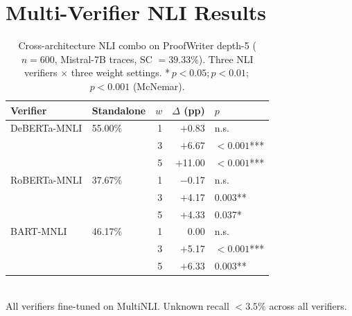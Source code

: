 \begin{table}[h]
\centering
\small
\caption{DRC on Mistral-7B ($K{=}12$, DeBERTa-large-mnli, $w{=}3$). $\tau{=}0.7$ recovers 83--90\% of full-combo gain at ${\sim}35\%$ NLI cost across both datasets.}
\label{tab:drc}
\end{table}

\section{Multi-Verifier NLI Results}
\label{app:multi-nli}

\begin{table}[h]
\centering
\small
\caption{Cross-architecture NLI combo on ProofWriter depth-5 ($n{=}600$, Mistral-7B traces, SC $= 39.33\%$). Three NLI verifiers $\times$ three weight settings. {*}\,$p < 0.05$;\enspace{**}\,$p < 0.01$;\enspace{***}\,$p < 0.001$ (McNemar).}
\label{tab:multi-nli}
\setlength{\tabcolsep}{3pt}
\begin{tabular}{@{}llrrl@{}}
\toprule
Verifier & Standalone & $w$ & $\Delta$ (pp) & $p$ \\
\midrule
DeBERTa-MNLI & 55.00\% & 1 & $+$0.83 & n.s. \\
 & & 3 & $+$6.67 & ${<}0.001${***} \\
 & & 5 & $+$11.00 & ${<}0.001${***} \\
\addlinespace
RoBERTa-MNLI & 37.67\% & 1 & $-$0.17 & n.s. \\
 & & 3 & $+$4.17 & 0.003{**} \\
 & & 5 & $+$4.33 & 0.037{*} \\
\addlinespace
BART-MNLI & 46.17\% & 1 & 0.00 & n.s. \\
 & & 3 & $+$5.17 & ${<}0.001${***} \\
 & & 5 & $+$6.33 & 0.003{**} \\
\bottomrule
\end{tabular}\\[2pt]
{\footnotesize All verifiers fine-tuned on MultiNLI. Unknown recall ${<}3.5\%$ across all verifiers.}
\end{table}

